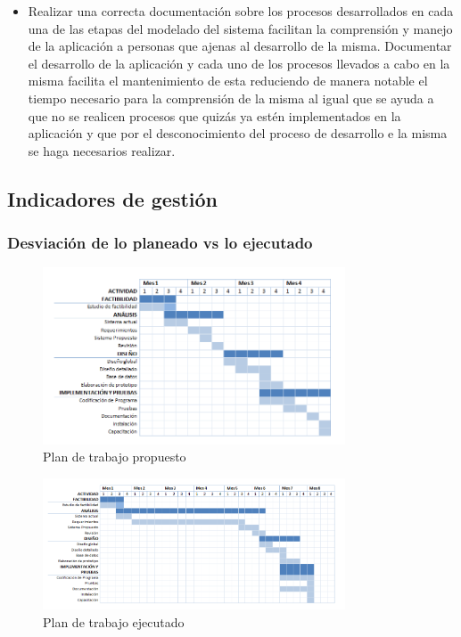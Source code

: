 \documentclass[12pt,oneside,letterpaper]{report}
\begin{document}
\begin{itemize}
 \item Realizar una correcta documentación sobre los procesos desarrollados en cada una de las etapas del modelado del sistema facilitan la comprensión y manejo de la aplicación a personas que ajenas al desarrollo de la misma. Documentar el desarrollo de la aplicación y cada uno de los procesos llevados a cabo en la misma facilita el mantenimiento de esta reduciendo de manera notable el tiempo necesario para la comprensión de la misma al igual que se ayuda a que no se realicen procesos que quizás ya estén implementados en la aplicación y que por el desconocimiento del proceso de desarrollo e la misma se haga necesarios realizar.
\end{itemize}

\subsection{Indicadores de gestión}
\subsubsection{Desviación de lo planeado vs lo ejecutado}

\begin{figure}[h!]
  \centering
    \includegraphics[width=0.80\textwidth]{./img/cal1.png}
  \caption{Plan de trabajo propuesto}
\end{figure}
 
\begin{figure}[h!]
  \centering
      \includegraphics[width=0.80\textwidth]{./img/cal2.png}
  \caption{Plan de trabajo ejecutado}
\end{figure}
\end{document}
